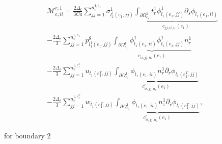 \documentclass{article}
\begin{document}
\begin{equation}
\begin{array}{l} \mathcal{M}_{e,ii}^{r,1} = \frac{2\Delta_t}{3Ca} \sum_{jj=1}^{n_v^{1,e_1}} \sigma_{l_1^1(e_1,jj)}^1 \underbrace{ \int_{\partial \Omega_{e_1}^{1}} t_r^1 \phi_{l_1(e_1,jj)}^1 \partial_s \phi_{l_1(e_1,ii)} }_{c_{jj,ii,t_r}(e_1)} \\ - \frac{2\Delta_t}{3} \sum_{jj=1}^{n_v^{1,e_1}} p_{l_1^1(e_1,jj)}^g \underbrace{ \int_{\partial \Omega_{e_1}^{1}} \phi_{l_1(e_1,ii)}^1 \phi_{l_1(e_1,jj)}^1 n_r^1 }_{c_{ii,jj,n_r}(e_1)} \\ - \frac{2\Delta_t}{3} \sum_{jj=1}^{n_v^{1,e_1^T}} u_{l_1(e_1^T,jj)} \underbrace{ \int_{\partial \Omega_{e_1}^{1}} \phi_{l_1(e_1,ii)} n_r^1 \partial_r \phi_{l_1(e_1^T,jj)} }_{c_{ii,jj,n_r}^r(e_1)} \\ - \frac{2\Delta_t}{3} \sum_{jj=1}^{n_v^{1,e_1^T}} w_{l_1(e_1^T,jj)} \underbrace{ \int_{\partial \Omega_{e_1}^{1}} \phi_{l_1(e_1,ii)} n_z^1 \partial_r \phi_{l_1(e_1^T,jj)} }_{c_{ii,jj,n_z}^r(e_1)}, \end{array} \tag{4.136}
\end{equation}

for boundary 2
\end{document}
